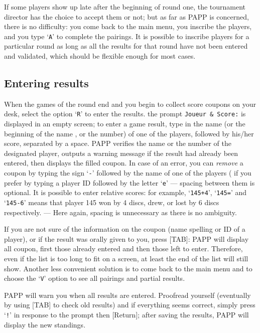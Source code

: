 \documentclass[10pt]{article}
\begin{document}
If some players show up late after the beginning of round one, the 
tournament director has the choice to accept them or not; but as far 
as PAPP is concerned, there is no difficulty: you come back to the 
main menu, you inscribe the players, and you type `\verb|A|' to 
complete the pairings.  It is possible to inscribe players for a 
particular round as long as all the results for that round have not 
been entered and validated, which should be flexible enough for most 
cases.

\subsection{Entering results}

When the games of the round end and you begin to collect score coupons 
on your desk, select the option `\verb|R|' to enter the results.  the 
prompt \verb|Joueur & Score:| is displayed in an empty screen; to 
enter a game result, type in the name (or the beginning of the name , 
or the number) of one of the players, followed by his/her score, 
separated by a space.  PAPP verifies the name or the number of the 
designated player, outputs a warning message if the result had already 
been entered, then displays the filled coupon. In case of an error, you can {\em remove} a coupon by typing the sign `\verb|-|' followed by the name of one of the players ( if you prefer by typing a player ID followed by the letter `\verb|e|' --- spacing between them is optional. It is possible to enter relative scores: for example, `\verb|145+4|', `\verb|145=|' and 
`\verb|145-6|' means that player 145 won by 4 discs, drew, or lost by 6 discs respectively. --- Here again, spacing is unnecessary as there is no ambiguity.

If you are not sure of the information on the coupon (name spelling or ID of a player), or if the result was orally given to you, press [TAB]: PAPP will display all coupon, first those already entered and then those left to enter.
Therefore, even if the list is too long to fit on a screen, at least the end of the list will still show. Another less convenient solution is to come back to the main menu and to choose the `\verb|V|' option to see all pairings and partial results.

PAPP will warn you when all results are entered. Proofread yourself (eventually by using [TAB] to check old results) and if everything seems correct, simply press `\verb|!|' in response to the prompt then  [Return]; after saving the results, PAPP will display the new standings.
\end{document}
